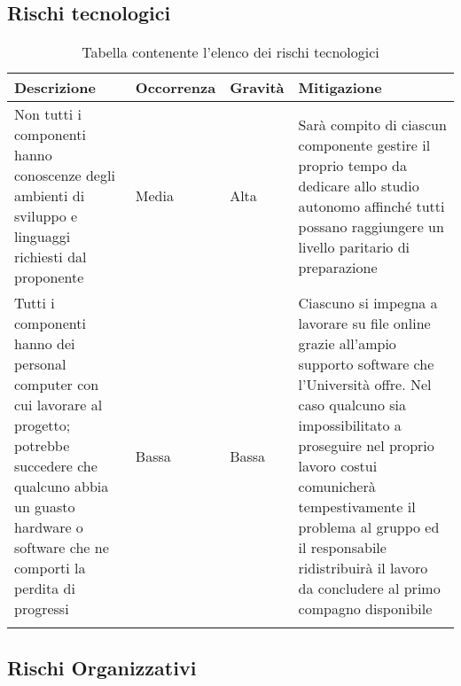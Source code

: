 \documentclass[../piano_di_progetto.tex]{subfiles}
\begin{document}
\subsection{Rischi tecnologici}%
\label{sub:rischi_tec}

\begin{center}
	\begin{longtable}{| p{3.5cm} | p{2cm}|p{2cm}|p{3.5cm}|}
		\hline
		\rowcolor{lightgray}
		{\textbf{Descrizione}} & {\textbf{Occorrenza}} & {\textbf{Gravità}} & {\textbf{Mitigazione}} \\

		\hline
			Non tutti i componenti hanno conoscenze degli ambienti di sviluppo e linguaggi richiesti dal proponente

			&
			Media
			& 
			Alta
			&
			Sarà compito di ciascun componente gestire il proprio tempo da dedicare allo studio autonomo affinché tutti possano raggiungere un livello paritario di preparazione 
\\			
			\hline
			Tutti i componenti hanno dei personal computer con cui lavorare al progetto; potrebbe succedere che qualcuno abbia un guasto hardware o software che ne comporti la perdita di progressi

			&
			Bassa
			& 
			Bassa
			& 
			Ciascuno si impegna a lavorare su file online grazie all’ampio supporto software che l’Università offre. Nel caso qualcuno sia impossibilitato a proseguire nel proprio lavoro costui comunicherà tempestivamente il problema al gruppo ed il responsabile ridistribuirà il lavoro da concludere al primo compagno disponibile\\
			\hline
\caption{Tabella contenente l'elenco dei rischi tecnologici}
	\end{longtable}

\end{center}

\subsection{Rischi Organizzativi}%
\label{sub:rischi_org}
\end{document}
